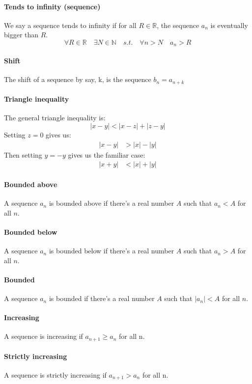 \documentclass{scrartcl}
\newcommand{\R}{\mathbb{R}}
\newcommand{\N}{\mathbb{N}}
\begin{document}
\paragraph{Tends to infinity (sequence)}
We say a sequence tends to infinity if for all $ R \in \R $, the sequence $ a_{n} $ is eventually bigger than $ R $.
\begin{equation}
\forall R \in \R \quad \exists N \in \N \quad s.t. \quad \forall n > N \quad a_{n} > R
\end{equation}
\paragraph{Shift}
The shift of a sequence by say, k, is the sequence $ b_{n} = a_{n + k} $
\paragraph{Triangle inequality}
The general triangle inequality is:
\begin{equation}
|x - y| < |x - z| + |z - y|
\end{equation}
Setting $ z = 0 $ gives us:
\begin{align}
|x - y| & > |x| - |y|
\end{align}
Then setting $ y = - y $ gives us the familiar case:
\begin{align}
|x + y| & < |x| + |y|
\end{align}
\paragraph{Bounded above}
A sequence $ a_{n} $ is bounded above if there's a real number $ A $ such that $ a_{n} < A $ for all $ n $.
\paragraph{Bounded below}
A sequence $ a_{n} $ is bounded below if there's a real number $ A $ such that $ a_{n} > A $ for all $ n $.
\paragraph{Bounded}
A sequence $ a_{n} $ is bounded if there's a real number $ A $ such that $ |a_{n}| < A $ for all $ n $.
\paragraph{Increasing}
A sequence is increasing if $ a_{n + 1} \geq a_{n} $ for all n.
\paragraph{Strictly increasing}
A sequence is strictly increasing if $ a_{n + 1} > a_{n} $ for all n.
\end{document}
